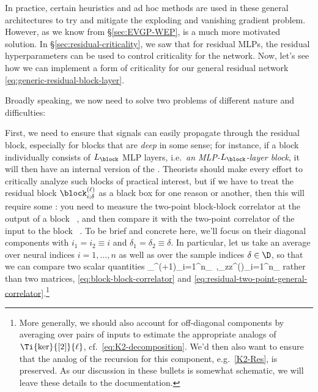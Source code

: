 In practice, certain heuristics and ad hoc methods are used in these general architectures to try and mitigate the exploding and vanishing gradient problem. However, as we know from \S\ref{sec:EVGP-WEP},  is a much more motivated solution. In \S\ref{sec:residual-criticality}, we saw that for residual MLPs, the residual hyperparameters can be used to control criticality for the network. Now, let's see how we can implement a form of criticality for our general residual network \eqref{eq:generic-residual-block-layer}.

Broadly speaking, we now need to solve two problems of different nature and difficulties:
\bi
\item First, we need to ensure that signals can easily propagate through the residual block, especially for blocks that are \emph{deep} in some sense; for instance, if a block individually consists of $L_\block$ MLP layers, i.e.~\emph{an MLP-$L_\block$-layer block}, it will then have an internal version of the . Theorists should make every effort to critically analyze such blocks  of practical interest, but if we have to treat the residual block $\block_{i;\delta}^{(\ell)}$ as a black  box for one reason or another, then 
this will require some :
 you need to measure the two-point block-block correlator at the output of a block
\be\label{eq:block-block-correlator}
\, ,
\ee
and then compare it with the two-point correlator of the input to the block
\be\label{eq:residual-two-point-general-correlator}
\, .
\ee
To be brief and concrete here, we'll focus on their diagonal components with $i_1=i_2\equiv i$ and $\delta_1=\delta_2\equiv\delta$. In particular, let us take an average over neural indices $i=1,\ldots,n$ as well as over the sample indices $\delta\in\D$, so that we can compare two scalar quantities
\be
{}_{\block\block}^{(\ell+1)}\equiv {}\sum_{i=1}^{n}\sum_{\delta\in\D}\, ,\qquad {}_{zz}^{(\ell)}\equiv {}\sum_{i=1}^{n}\sum_{\delta\in\D}
\ee
rather than two matrices, \eqref{eq:block-block-correlator} and \eqref{eq:residual-two-point-general-correlator}.\footnote{
    More generally, we should also account for off-diagonal components by averaging over pairs of inputs to estimate the appropriate analogs of $\Ti{\ker}{[2]}{\ell}$, cf.~\eqref{eq:K2-decomposition}. We'd then also want to ensure that the analog of the recursion for this component, e.g.~\eqref{K2-Res}, is preserved. %
    As our discussion in these bullets is somewhat schematic, we will leave these details to the  documentation.
}
